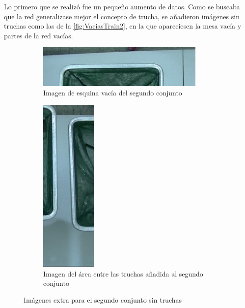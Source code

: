 Lo primero que se realizó fue un pequeño aumento de datos. Como se buscaba que la red generalizase mejor el concepto de trucha, se añadieron imágenes sin truchas como las de 
la \autoref{fig:VaciasTrain2}, en la que apareciesen la mesa vacía y partes de la red vacías.

\begin{figure}[H]
    \centering
    \begin{subfigure}[t]{0.55\textwidth}
        \centering
        \includegraphics[width=0.9\textwidth]{images/6/6.3/esquinaTopVacia.jpg}
        \caption{Imagen de esquina vacía del segundo conjunto}
    \end{subfigure}
    \begin{subfigure}[t]{0.4\textwidth}
        \centering
        \includegraphics[width=0.3\textwidth]{images/6/6.3/medioVacio.jpg}
        \caption{Imagen del área entre las truchas añadida al segundo conjunto}
    \end{subfigure}
    \caption{Imágenes extra para el segundo conjunto sin truchas}
    \label{fig:VaciasTrain2}
\end{figure}

